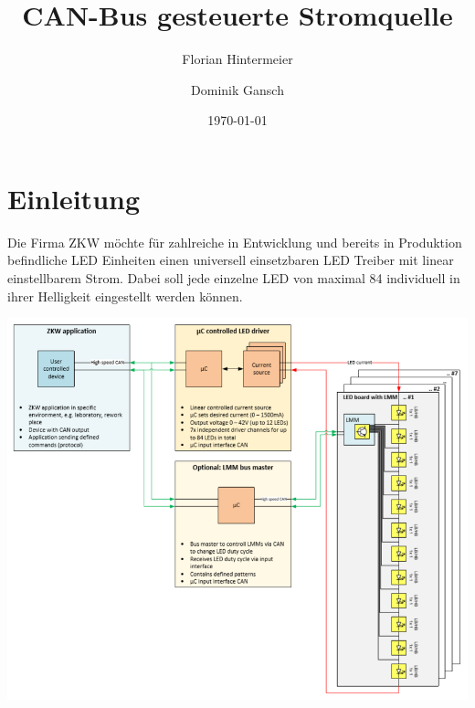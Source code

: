 \documentclass[paper=a4, 12pt]{scrreprt}
\title{CAN-Bus gesteuerte Stromquelle}
\author{Florian Hintermeier \and Dominik Gansch}
\date{\today}
\begin{document}
\frontmatter

\maketitle




\tableofcontents

\mainmatter

\chapter{Einleitung}
    Die Firma ZKW möchte für zahlreiche in Entwicklung und bereits in Produktion befindliche LED Einheiten einen universell einsetzbaren LED Treiber mit linear einstellbarem Strom. Dabei soll jede einzelne LED von maximal 84 individuell in ihrer Helligkeit eingestellt werden können.
    
	\begin{adjustbox}{center,caption={Blockschaltbild von ZKW},label={ZKW-Blockschaltbild},nofloat=figure,vspace=\bigskipamount}
	\includegraphics[width=15cm]{img/ZKW_Blockschaltbild.PNG}
	\end{adjustbox}
\end{document}
